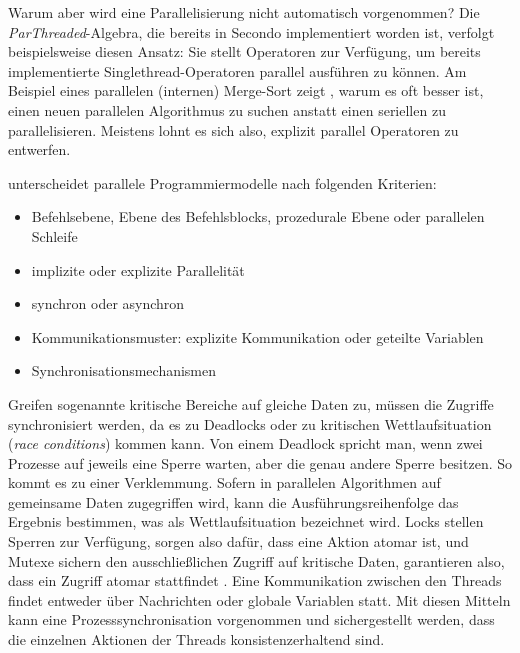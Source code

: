 \documentclass[a4paper,12pt,twoside]{article}
\newcommand{\Fb}[1]{\textit{#1}} %
\begin{document}
Warum aber wird eine Parallelisierung nicht automatisch vorgenommen? Die \Fb{ParThreaded}-Algebra, die bereits in Secondo implementiert worden ist, verfolgt beispielsweise
diesen Ansatz: Sie stellt Operatoren zur Verfügung, um bereits implementierte Singlethread-Operatoren parallel ausführen zu können. Am Beispiel eines parallelen (internen) Merge-Sort zeigt {\textcite{McCool2012}}, warum es oft besser ist, einen neuen parallelen Algorithmus zu suchen anstatt einen seriellen zu parallelisieren. Meistens lohnt es sich also, explizit parallel Operatoren zu entwerfen.

{\textcite[S.104]{Rauber2013}} unterscheidet parallele Programmiermodelle nach folgenden Kriterien:

\begin{itemize}
	\item Befehlsebene, Ebene des Befehlsblocks, prozedurale Ebene oder parallelen%
	Schleife
	\item implizite oder explizite Parallelität
	\item synchron oder asynchron
	\item Kommunikationsmuster: explizite Kommunikation oder geteilte Variablen
	\item Synchronisationsmechanismen
\end{itemize} 

Greifen sogenannte kritische Bereiche auf gleiche Daten zu, müssen die Zugriffe synchronisiert werden, da es zu Deadlocks oder zu kritischen Wettlaufsituation (\Fb{race conditions}) kommen kann. Von einem Deadlock spricht man, wenn zwei Prozesse auf jeweils eine Sperre warten, aber die genau andere Sperre besitzen. So kommt es zu einer Verklemmung. Sofern in parallelen Algorithmen auf gemeinsame Daten zugegriffen wird, kann die Ausführungsreihenfolge das Ergebnis bestimmen, was als Wettlaufsituation bezeichnet wird. Locks stellen Sperren zur Verfügung, sorgen also dafür, dass eine Aktion atomar ist, und Mutexe sichern den ausschließlichen Zugriff auf kritische Daten, garantieren also, dass ein Zugriff atomar stattfindet \parencite{Rauber2013}. Eine Kommunikation zwischen den Threads findet entweder über Nachrichten oder globale Variablen statt. Mit diesen Mitteln kann eine Prozesssynchronisation vorgenommen und sichergestellt werden, dass die einzelnen Aktionen der Threads konsistenzerhaltend sind.
\end{document}
